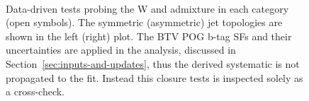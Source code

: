 \begin{figure}[h!]
  \begin{center}
    ~~
    \caption{Data-driven tests probing the W and \ttbar admixture in
      each \njet category (open symbols). The symmetric (asymmetric)
      jet topologies are shown in the left (right) plot. The BTV POG
      b-tag SFs and their uncertainties are applied in the analysis,
      discussed in Section~\ref{sec:inputs-and-updates}, thus the
      derived systematic is not propagated to the fit. Instead this 
      closure tests is inspected solely as a cross-check. 
    }
    \label{fig:closureBTag}
  \end{center} 
\end{figure}

